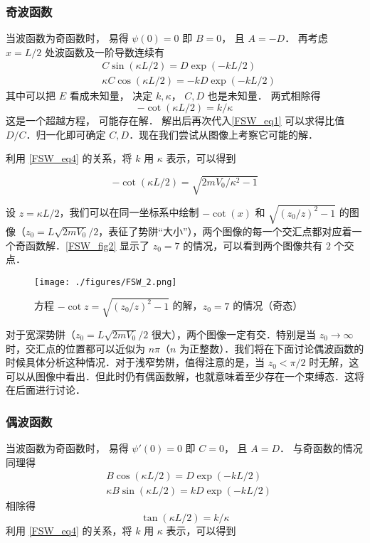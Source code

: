 \subsubsection{奇波函数}
当波函数为奇函数时， 易得 $\psi(0) = 0$ 即 $B = 0$， 且 $A = -D$． 再考虑 $x = L/2$ 处波函数及一阶导数连续有
\begin{equation}\label{FSW_eq1}
\begin{aligned}
&C\sin(\kappa L/2) = D \exp(-kL/2)\\
&\kappa C \cos(\kappa L/2) = -kD \exp(-kL/2)
\end{aligned}
\end{equation}
其中可以把 $E$ 看成未知量， 决定 $k, \kappa$， $C,D$ 也是未知量． 两式相除得
\begin{equation}\label{FSW_eq2}
-\cot(\kappa L/2) = k/\kappa
\end{equation}
这是一个超越方程， 可能存在解． 解出后再次代入\autoref{FSW_eq1} 可以求得比值 $D/C$．归一化即可确定 $C, D$．现在我们尝试从图像上考察它可能的解．

利用 \autoref{FSW_eq4} 的关系，将 $k$ 用 $\kappa$ 表示，可以得到

\begin{equation}
-\cot(\kappa L/2)=\sqrt{2mV_0/\kappa^2-1}
\end{equation}

设 $z=\kappa L/2$，我们可以在同一坐标系中绘制 $-\cot(x)$ 和 $\sqrt{(z_0/z)^2-1}$ 的图像（$z_0=L\sqrt{2mV_0}/2$，表征了势阱“大小”），两个图像的每一个交汇点都对应着一个奇函数解．\autoref{FSW_fig2} 显示了 $z_0=7$ 的情况，可以看到两个图像共有 $2$ 个交点．

\begin{figure}[ht]
\centering
\texttt{[image: ./figures/FSW\_2.png]}
\caption{方程 $-\cot z=\sqrt{(z_0/z)^2-1}$ 的解，$z_0=7$ 的情况（奇态）} \label{FSW_fig2}
\end{figure}

对于宽深势阱（$z_0=L\sqrt{2mV_0}/2$ 很大），两个图像一定有交．特别是当 $z_0\rightarrow\infty$ 时，交汇点的位置都可以近似为 $n\pi$（$n$ 为正整数）．我们将在下面讨论偶波函数的时候具体分析这种情况．对于浅窄势阱，值得注意的是，当 $z_0<\pi/2$ 时无解，这可以从图像中看出．但此时仍有偶函数解，也就意味着至少存在一个束缚态．这将在后面进行讨论．

\subsubsection{偶波函数}
当波函数为奇函数时， 易得 $\psi'(0) = 0$ 即 $C = 0$， 且 $A = D$． 与奇函数的情况同理得
\begin{equation}
\begin{aligned}
&B\cos(\kappa L/2) = D \exp(-kL/2)\\
&\kappa B \sin(\kappa L/2) = kD \exp(-kL/2)
\end{aligned}
\end{equation}
相除得
\begin{equation}\label{FSW_eq3}
\tan(\kappa L/2) = k/\kappa
\end{equation}
利用 \autoref{FSW_eq4} 的关系，将 $k$ 用 $\kappa$ 表示，可以得到

